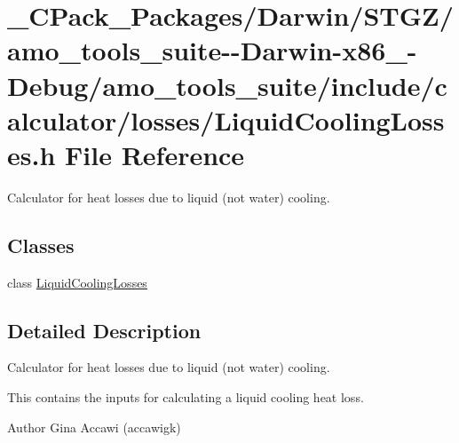 \hypertarget{___c_pack___packages_2_darwin_2_s_t_g_z_2amo__tools__suite--_darwin-x86__64-_debug_2amo__tools__2e6a7324c8a2a69ed2d6c64fe915b79f}{}\section{\+\_\+\+C\+Pack\+\_\+\+Packages/\+Darwin/\+S\+T\+G\+Z/amo\+\_\+tools\+\_\+suite-\/-\/\+Darwin-\/x86\+\_-\/\+Debug/amo\+\_\+tools\+\_\+suite/include/calculator/losses/\+Liquid\+Cooling\+Losses.h File Reference}
\label{___c_pack___packages_2_darwin_2_s_t_g_z_2amo__tools__suite--_darwin-x86__64-_debug_2amo__tools__2e6a7324c8a2a69ed2d6c64fe915b79f}


Calculator for heat losses due to liquid (not water) cooling.  


\subsection*{Classes}
\begin{DoxyCompactItemize}
\item 
class \hyperlink{class_liquid_cooling_losses}{Liquid\+Cooling\+Losses}
\end{DoxyCompactItemize}


\subsection{Detailed Description}
Calculator for heat losses due to liquid (not water) cooling. 

This contains the inputs for calculating a liquid cooling heat loss.

\begin{DoxyAuthor}{Author}
Gina Accawi (accawigk) 
\end{DoxyAuthor}
